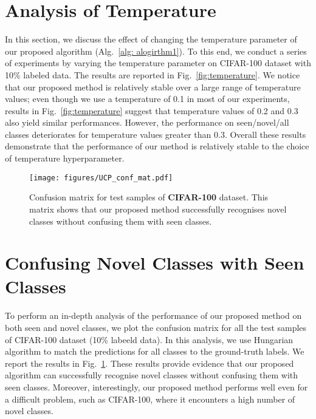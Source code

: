 \documentclass[runningheads]{eccv2022submission}
\begin{document}
\section{Analysis of Temperature}
\label{sec:temp}
In this section, we discuss the effect of changing the temperature parameter of our proposed algorithm (Alg.~\ref{alg: alogirthm1}). To this end, we conduct a series of experiments by varying the temperature parameter on CIFAR-100 dataset with 10\% labeled data. The results are reported in Fig.~\ref{fig:temperature}. We notice that our proposed method is relatively stable over a large range of temperature values; even though we use a temperature of 0.1 in most of our experiments, results in Fig.~\ref{fig:temperature} suggest that temperature values of 0.2 and 0.3 also yield similar performances. However, the performance on seen/novel/all classes deteriorates for temperature values greater than 0.3. Overall these results demonstrate that the performance of our method is relatively stable to the choice of temperature hyperparameter. 

\begin{figure}[h]
\begin{center}
\texttt{[image: figures/UCP\_conf\_mat.pdf]}
\caption{Confusion matrix for test samples of \textbf{CIFAR-100} dataset. This matrix shows that our proposed method successfully recognises novel classes without confusing them with seen classes.}
\label{fig:confusion}
\end{center}
\end{figure}

\section{Confusing Novel Classes with Seen Classes}
\label{sec:conf_mat}
To perform an in-depth analysis of the performance of our proposed method on both seen and novel classes, we plot the confusion matrix for all the test samples of CIFAR-100 dataset (10\% labeeld data). In this analysis, we use Hungarian algorithm\cite{kuhn1955hungarian} to match the predictions for all classes to the ground-truth labels. We report the results in Fig.~\ref{fig:confusion}. These results provide evidence that our proposed algorithm can successfully recognise novel classes without confusing them with seen classes. Moreover, interestingly, our proposed method performs well even for a difficult problem, such as CIFAR-100, where it encounters a high number of novel classes.     

\clearpage


\end{document}

